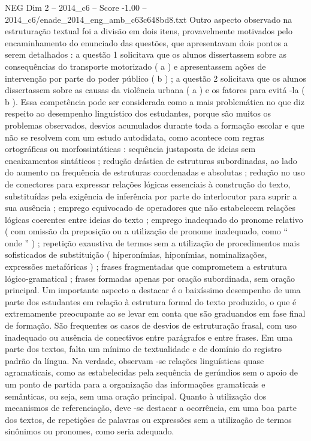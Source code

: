 \begin{textsample}{NEG Dim 2 – 2014\_c6 – Score -1.00 – 2014\_c6/enade\_2014\_eng\_amb\_c63c648bd8.txt}
Outro aspecto observado na estruturação textual foi a divisão em dois itens, provavelmente motivados pelo encaminhamento do enunciado das questões, que apresentavam dois pontos a serem detalhados : a questão 1 solicitava que os alunos dissertassem sobre as consequências do transporte motorizado ( a ) e apresentassem ações de intervenção por parte do poder público ( b ) ; a questão 2 solicitava que os alunos dissertassem sobre as causas da violência urbana ( a ) e os fatores para evitá -la ( b ).
Essa competência pode ser considerada como a mais problemática no que diz respeito ao desempenho linguístico dos estudantes, porque são muitos os problemas observados, desvios acumulados durante toda a formação escolar e que não se resolvem com um estudo autodidata, como acontece com regras ortográficas ou morfossintáticas : sequência justaposta de ideias sem encaixamentos sintáticos ; redução drástica de estruturas subordinadas, ao lado do aumento na frequência de estruturas coordenadas e absolutas ; redução no uso de conectores para expressar relações lógicas essenciais à construção do texto, substituídas pela exigência de inferência por parte do interlocutor para suprir a sua ausência ; emprego equivocado de operadores que não estabelecem relações lógicas coerentes entre ideias do texto ; emprego inadequado do pronome relativo ( com omissão da preposição ou a utilização de pronome inadequado, como “ onde ” ) ; repetição exaustiva de termos sem a utilização de procedimentos mais sofisticados de substituição ( hiperonímias, hiponímias, nominalizações, expressões metafóricas ) ; frases fragmentadas que comprometem a estrutura lógico-gramatical ; frases formadas apenas por oração subordinada, sem oração principal.
Um importante aspecto a destacar é o baixíssimo desempenho de uma parte dos estudantes em relação à estrutura formal do texto produzido, o que é extremamente preocupante ao se levar em conta que são graduandos em fase final de formação.
São frequentes os casos de desvios de estruturação frasal, com uso inadequado ou ausência de conectivos entre parágrafos e entre frases.
Em uma parte dos textos, falta um mínimo de textualidade e de domínio do registro padrão da língua.
Na verdade, observam -se relações linguísticas quase agramaticais, como as estabelecidas pela sequência de gerúndios sem o apoio de um ponto de partida para a organização das informações gramaticais e semânticas, ou seja, sem uma oração principal.
Quanto à utilização dos mecanismos de referenciação, deve -se destacar a ocorrência, em uma boa parte dos textos, de repetições de palavras ou expressões sem a utilização de termos sinônimos ou pronomes, como seria adequado.

\end{textsample}
